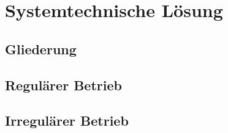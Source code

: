\chapter{Systemtechnische Lösung}
\label{chapter:Pflichtenheft-SystemtechnischeLoesung}

\section{Gliederung}
\label{section:Pflichtenheft-SystemtechnischeLoesung-Gliederung}

\section{Regulärer Betrieb}
\label{section:Pflichtenheft-SystemtechnischeLoesung-regulaer}

\section{Irregulärer Betrieb}
\label{section:Pflichtenheft-SystemtechnischeLoesung-irregulaer}

